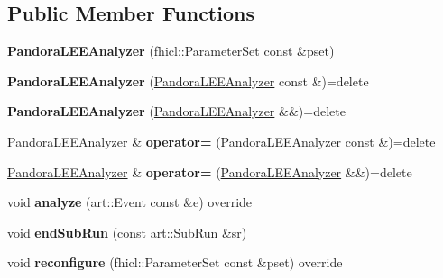 \subsection*{Public Member Functions}
\begin{DoxyCompactItemize}
\item 
\hypertarget{classlee_1_1PandoraLEEAnalyzer_ad44c43aa463d3ec0185357e593808a99}{{\bfseries Pandora\-L\-E\-E\-Analyzer} (fhicl\-::\-Parameter\-Set const \&pset)}\label{classlee_1_1PandoraLEEAnalyzer_ad44c43aa463d3ec0185357e593808a99}

\item 
\hypertarget{classlee_1_1PandoraLEEAnalyzer_a50f8e3ecdc7892d554c68080645af88c}{{\bfseries Pandora\-L\-E\-E\-Analyzer} (\hyperlink{classlee_1_1PandoraLEEAnalyzer}{Pandora\-L\-E\-E\-Analyzer} const \&)=delete}\label{classlee_1_1PandoraLEEAnalyzer_a50f8e3ecdc7892d554c68080645af88c}

\item 
\hypertarget{classlee_1_1PandoraLEEAnalyzer_a8e9dc3f96fcb2881bee2bfb46dcedaaf}{{\bfseries Pandora\-L\-E\-E\-Analyzer} (\hyperlink{classlee_1_1PandoraLEEAnalyzer}{Pandora\-L\-E\-E\-Analyzer} \&\&)=delete}\label{classlee_1_1PandoraLEEAnalyzer_a8e9dc3f96fcb2881bee2bfb46dcedaaf}

\item 
\hypertarget{classlee_1_1PandoraLEEAnalyzer_ae71d8ba45ecaaa09a587ecf3cd693675}{\hyperlink{classlee_1_1PandoraLEEAnalyzer}{Pandora\-L\-E\-E\-Analyzer} \& {\bfseries operator=} (\hyperlink{classlee_1_1PandoraLEEAnalyzer}{Pandora\-L\-E\-E\-Analyzer} const \&)=delete}\label{classlee_1_1PandoraLEEAnalyzer_ae71d8ba45ecaaa09a587ecf3cd693675}

\item 
\hypertarget{classlee_1_1PandoraLEEAnalyzer_a79984f454c76dbb927254731d85e40c4}{\hyperlink{classlee_1_1PandoraLEEAnalyzer}{Pandora\-L\-E\-E\-Analyzer} \& {\bfseries operator=} (\hyperlink{classlee_1_1PandoraLEEAnalyzer}{Pandora\-L\-E\-E\-Analyzer} \&\&)=delete}\label{classlee_1_1PandoraLEEAnalyzer_a79984f454c76dbb927254731d85e40c4}

\item 
\hypertarget{classlee_1_1PandoraLEEAnalyzer_ac0fd03bb0abb068d025680dc62384dea}{void {\bfseries analyze} (art\-::\-Event const \&e) override}\label{classlee_1_1PandoraLEEAnalyzer_ac0fd03bb0abb068d025680dc62384dea}

\item 
\hypertarget{classlee_1_1PandoraLEEAnalyzer_a129028bbbe1b6ff01446c65dcdbe60e9}{void {\bfseries end\-Sub\-Run} (const art\-::\-Sub\-Run \&sr)}\label{classlee_1_1PandoraLEEAnalyzer_a129028bbbe1b6ff01446c65dcdbe60e9}

\item 
\hypertarget{classlee_1_1PandoraLEEAnalyzer_a0fff1d77f940b9327b2e047266afffb4}{void {\bfseries reconfigure} (fhicl\-::\-Parameter\-Set const \&pset) override}\label{classlee_1_1PandoraLEEAnalyzer_a0fff1d77f940b9327b2e047266afffb4}

\end{DoxyCompactItemize}


